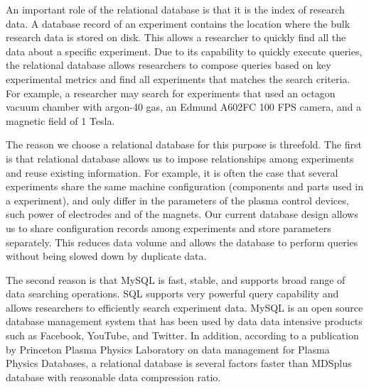 An important role of the relational database is that it is the index of research data. A database record of an experiment contains the location where the bulk research data is stored on disk. This allows a researcher to quickly find all the data about a specific experiment. Due to its capability to quickly execute queries, the relational database allows researchers to compose queries based on key experimental metrics and find all experiments that matches the search criteria. For example, a researcher may search for experiments that used an octagon vacuum chamber with argon-40 gas, an Edmund A602FC 100 FPS camera, and a magnetic field of 1 Tesla.

The reason we choose a relational database for this purpose is threefold. The first is that relational database allows us to impose relationships among experiments and reuse existing information. For example, it is often the case that several experiments share the same machine configuration (components and parts used in a experiment), and only differ in the parameters of the plasma control devices, such power of electrodes and of the magnets. Our current database design allows us to share configuration records among experiments and store parameters separately. This reduces data volume and allows the database to perform queries without being slowed down by duplicate data.

The second reason is that MySQL is fast, stable, and supports broad range of data searching operations. SQL supports very powerful query capability and allows researchers to efficiently search experiment data. MySQL is an open source database management system that has been used by data data intensive products such as Facebook\cite{thusoo2010data}, YouTube\cite{jackson_youtube_mysql}, and Twitter\cite{winterford_twitter_mysql}. In addition, according to a publication by Princeton Plasma Physics Laboratory on data management for Plasma Physics Databases\cite{Davis2004183}, a relational database is several factors faster than MDSplus\cite{stillerman1997mdsplus} database with reasonable data compression ratio.



